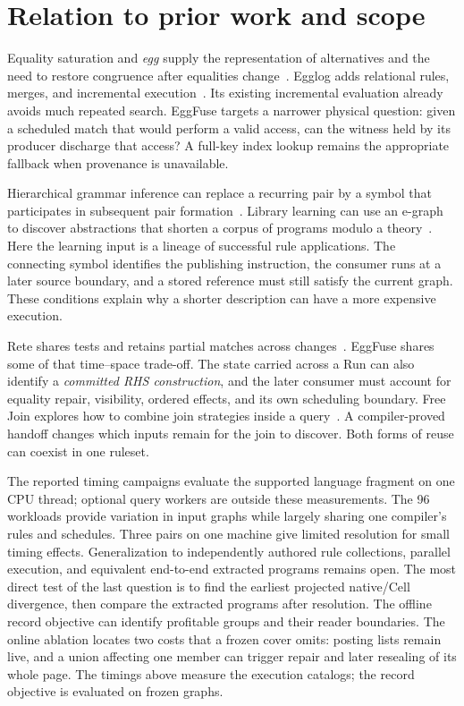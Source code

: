 \documentclass[10pt,letterpaper]{article}
\begin{document}
\section{Relation to prior work and scope}
Equality saturation and \emph{egg} supply the representation of alternatives and the need to restore congruence after equalities change~\cite{tate,egg}. Egglog adds relational rules, merges, and incremental execution~\cite{egglog}. Its existing incremental evaluation already avoids much repeated search. EggFuse targets a narrower physical question: given a scheduled match that would perform a valid access, can the witness held by its producer discharge that access? A full-key index lookup remains the appropriate fallback when provenance is unavailable.

Hierarchical grammar inference can replace a recurring pair by a symbol that participates in subsequent pair formation~\cite{sequitur}. Library learning can use an e-graph to discover abstractions that shorten a corpus of programs modulo a theory~\cite{babble}. Here the learning input is a lineage of successful rule applications. The connecting symbol identifies the publishing instruction, the consumer runs at a later source boundary, and a stored reference must still satisfy the current graph. These conditions explain why a shorter description can have a more expensive execution.

Rete shares tests and retains partial matches across changes~\cite{rete}. EggFuse shares some of that time--space trade-off. The state carried across a Run can also identify a \emph{committed RHS construction}, and the later consumer must account for equality repair, visibility, ordered effects, and its own scheduling boundary. Free Join explores how to combine join strategies inside a query~\cite{freejoin}. A compiler-proved handoff changes which inputs remain for the join to discover. Both forms of reuse can coexist in one ruleset.

The reported timing campaigns evaluate the supported language fragment on one CPU thread; optional query workers are outside these measurements. The 96 workloads provide variation in input graphs while largely sharing one compiler's rules and schedules. Three pairs on one machine give limited resolution for small timing effects. Generalization to independently authored rule collections, parallel execution, and equivalent end-to-end extracted programs remains open. The most direct test of the last question is to find the earliest projected native/Cell divergence, then compare the extracted programs after resolution. The offline record objective can identify profitable groups and their reader boundaries. The online ablation locates two costs that a frozen cover omits: posting lists remain live, and a union affecting one member can trigger repair and later resealing of its whole page. The timings above measure the execution catalogs; the record objective is evaluated on frozen graphs.
\end{document}
